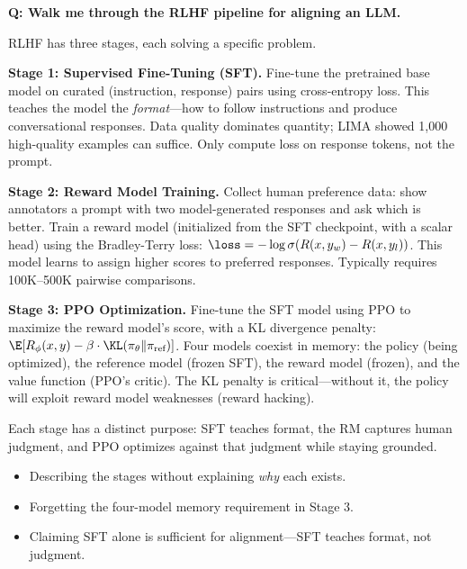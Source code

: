 \begin{interviewq}
\textbf{Q: Walk me through the RLHF pipeline for aligning an LLM.}

 \quad {} \quad \badgefreq{\freqhigh}

\stronganswer

RLHF has three stages, each solving a specific problem.

\textbf{Stage 1: Supervised Fine-Tuning (SFT).} Fine-tune the pretrained base model on curated (instruction, response) pairs using cross-entropy loss. This teaches the model the \textit{format}---how to follow instructions and produce conversational responses. Data quality dominates quantity; LIMA showed 1,000 high-quality examples can suffice. Only compute loss on response tokens, not the prompt.

\textbf{Stage 2: Reward Model Training.} Collect human preference data: show annotators a prompt with two model-generated responses and ask which is better. Train a reward model (initialized from the SFT checkpoint, with a scalar head) using the Bradley-Terry loss: $\loss = -\log\sigma(R(x,y_w) - R(x,y_l))$. This model learns to assign higher scores to preferred responses. Typically requires 100K--500K pairwise comparisons.

\textbf{Stage 3: PPO Optimization.} Fine-tune the SFT model using PPO to maximize the reward model's score, with a KL divergence penalty: $\E[R_\phi(x,y) - \beta \cdot \KL(\pi_\theta \| \pi_{\text{ref}})]$. Four models coexist in memory: the policy (being optimized), the reference model (frozen SFT), the reward model (frozen), and the value function (PPO's critic). The KL penalty is critical---without it, the policy will exploit reward model weaknesses (reward hacking).

Each stage has a distinct purpose: SFT teaches format, the RM captures human judgment, and PPO optimizes against that judgment while staying grounded.

\redflags
\begin{itemize}
    \item Describing the stages without explaining \textit{why} each exists.
    \item Forgetting the four-model memory requirement in Stage 3.
    \item Claiming SFT alone is sufficient for alignment---SFT teaches format, not judgment.
\end{itemize}



\end{interviewq}
